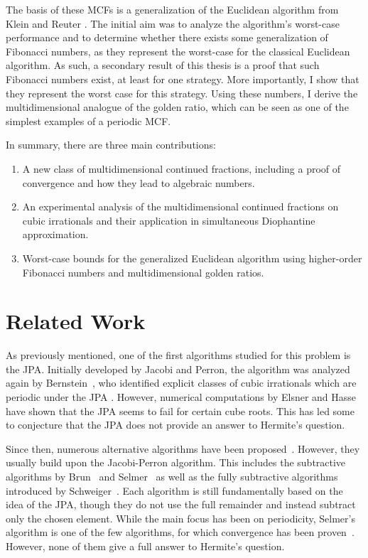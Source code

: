 The basis of these MCFs is a generalization of the Euclidean algorithm from
Klein and Reuter \cite{Klein24}.
The initial aim was to analyze the algorithm's worst-case performance
and to determine whether there exists some generalization of Fibonacci numbers,
as they represent the worst-case for the classical Euclidean algorithm.
As such, a secondary result of this thesis is a proof that such Fibonacci numbers exist, at least for one strategy.
More importantly, I show that they represent the worst case for this strategy.
Using these numbers, I derive the multidimensional analogue of the golden
ratio, which can be seen as one of the simplest examples of a periodic MCF.

In summary, there are three main contributions:
\begin{enumerate}
  \item A new class of multidimensional continued fractions, including a proof
    of convergence and how they lead to algebraic numbers.
  \item An experimental analysis of the multidimensional continued fractions
    on cubic irrationals and their application in simultaneous
    Diophantine approximation.
  \item Worst-case bounds for the generalized Euclidean algorithm
    using higher-order Fibonacci numbers and multidimensional golden ratios.
\end{enumerate}

\section{Related Work}
\label{sec:related-work}

As previously mentioned,
one of the first algorithms studied for this problem is the JPA.
Initially developed by Jacobi and Perron,
the algorithm was analyzed again by Bernstein~\cite{Bernstein71},
who identified explicit classes of cubic irrationals which are periodic under
the JPA \cite{Bernstein64A, Bernstein65, Bernstein64B}.
However, numerical computations by Elsner and Hasse \cite{Elsner67} have shown
that the JPA seems to fail for certain cube roots.
This has led some to conjecture that the JPA does not provide an answer to Hermite's question.

Since then, numerous alternative algorithms have been
proposed~\cite{Assaf05, Hendy81, Schweiger13, Schweiger00}.
However, they usually build upon the Jacobi-Perron algorithm.
This includes the subtractive algorithms by
Brun~\cite{Brun19} and Selmer~\cite{Selmer67}
as well as the fully subtractive algorithms introduced by Schweiger~\cite{Schweiger95}.
Each algorithm is still fundamentally based on the idea of the JPA, though they
do not use the full remainder and instead subtract only the chosen element.
While the main focus has been on periodicity, Selmer's algorithm is one of the
few algorithms, for which convergence has been proven~\cite{Bruin15}.
However, none of them give a full answer to Hermite's question.

